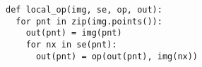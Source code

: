 \documentclass[varwidth=8cm, border={0.1cm 0.1cm 0.1cm 0.1cm}]{standalone}
\begin{document}
\begin{verbatim}
def local_op(img, se, op, out):
  for pnt in zip(img.points()):
    out(pnt) = img(pnt)
    for nx in se(pnt):
      out(pnt) = op(out(pnt), img(nx))
\end{verbatim}
\end{document}
